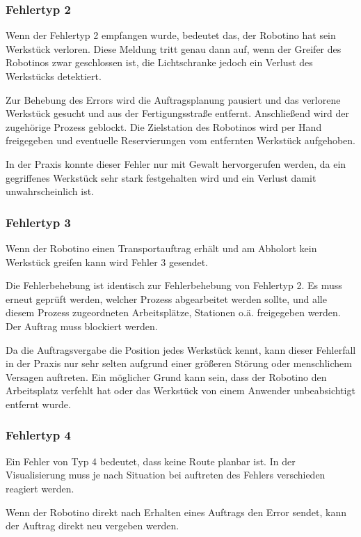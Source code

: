 \subsubsection{Fehlertyp 2}

Wenn der Fehlertyp 2 empfangen wurde, bedeutet das, der Robotino hat sein Werkstück verloren. Diese Meldung tritt genau dann auf, wenn der Greifer des Robotinos zwar geschlossen ist, die Lichtschranke jedoch ein Verlust des Werkstücks detektiert. 

Zur Behebung des Errors wird die Auftragsplanung pausiert und das verlorene Werkstück gesucht und aus der Fertigungsstraße entfernt. Anschließend wird der zugehörige Prozess geblockt. Die Zielstation des Robotinos wird per Hand freigegeben und eventuelle Reservierungen vom entfernten Werkstück aufgehoben. 

In der Praxis konnte dieser Fehler nur mit Gewalt hervorgerufen werden, da ein gegriffenes Werkstück sehr stark festgehalten wird und ein Verlust damit unwahrscheinlich ist. 

\subsubsection{Fehlertyp 3}

Wenn der Robotino einen Transportauftrag erhält und am Abholort kein Werkstück greifen kann wird Fehler 3 gesendet. 

Die Fehlerbehebung ist identisch zur Fehlerbehebung von Fehlertyp 2. Es muss erneut geprüft werden, welcher Prozess abgearbeitet werden sollte, und alle diesem Prozess zugeordneten Arbeitsplätze, Stationen o.ä. freigegeben werden. Der Auftrag muss blockiert werden.

Da die Auftragsvergabe die Position jedes Werkstück kennt, kann dieser Fehlerfall in der Praxis nur sehr selten aufgrund einer größeren Störung oder menschlichem Versagen auftreten. Ein möglicher Grund kann sein, dass der Robotino den Arbeitsplatz verfehlt hat oder das Werkstück von einem Anwender unbeabsichtigt entfernt wurde. 

\subsubsection{Fehlertyp 4}

Ein Fehler von Typ 4 bedeutet, dass keine Route planbar ist. In der Visualisierung muss je nach Situation bei auftreten des Fehlers verschieden reagiert werden. 

Wenn der Robotino direkt nach Erhalten eines Auftrags den Error sendet, kann der Auftrag direkt neu vergeben werden. 

